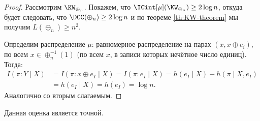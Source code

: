 \begin{proof}
    Рассмотрим $\KW_{\oplus_n}$. Покажем, что $\ICint[\mu](\KW_{\oplus_n}) \ge 2 \log n$, откуда будет
    следовать, что $\DCC(\oplus_n) \ge 2 \log n$ и по теореме \ref{th:KW-theorem} мы получим $L(\oplus_n)
    \ge n^2$.

    Определим распределение $\mu$: равномерное распределение на парах $(x, x \oplus e_i) $, по всем $x
    \in \oplus_n^{-1}(1)$ (по всем $x$, в записи которых нечётное число единиц). Тогда:
    \begin{align*}
        I(\pi : Y \mid X) &= I(\pi: x \oplus e_I \mid X) = I(\pi : e_I \mid X) = h(e_I \mid X) - h(\pi
                            \mid X, e_I) \\
        &= h(e_I \mid X) = h(e_I) = \log n.
    \end{align*}
    Аналогично со вторым слагаемым.
\end{proof}

Данная оценка является точной.
